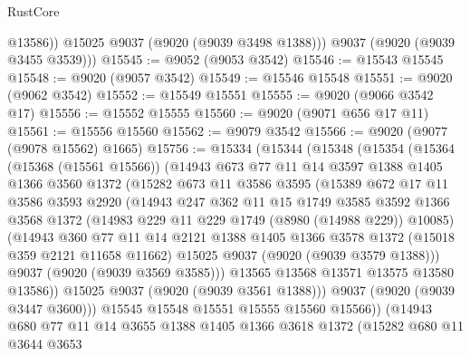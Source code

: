 \begin{lexlean}{RustCore}
\begin{coremodule}
            @13586))
        @15025
        @9037
        (@9020 (@9039 @3498 @1388)))
      @9037
      (@9020 (@9039 @3455 @3539)))
@15545 := @9052 (@9053 @3542)
@15546 := @15543 @15545
@15548 := @9020 (@9057 @3542)
@15549 := @15546 @15548
@15551 := @9020 (@9062 @3542)
@15552 := @15549 @15551
@15555 := @9020 (@9066 @3542 @17)
@15556 := @15552 @15555
@15560 := @9020 (@9071 @656 @17 @11)
@15561 := @15556 @15560
@15562 := @9079 @3542
@15566 := @9020 (@9077 (@9078 @15562) @1665)
@15756 := @15334
    (@15344
      (@15348
        (@15354
          (@15364
            (@15368 (@15561 @15566))
            (@14943
              @673
              @77
              @11
              @14
              @3597
              @1388
              @1405
              @1366
              @3560
              @1372
              (@15282
                @673
                @11
                @3586
                @3595
                (@15389
                  @672
                  @17
                  @11
                  @3586
                  @3593
                  @2920
                  (@14943
                    @247
                    @362
                    @11
                    @15
                    @1749
                    @3585
                    @3592
                    @1366
                    @3568
                    @1372
                    (@14983 @229 @11 @229 @1749 (@8980 (@14988 @229)) @10085)
                    (@14943
                      @360
                      @77
                      @11
                      @14
                      @2121
                      @1388
                      @1405
                      @1366
                      @3578
                      @1372
                      (@15018 @359 @2121 @11658 @11662)
                      @15025
                      @9037
                      (@9020 (@9039 @3579 @1388)))
                    @9037
                    (@9020 (@9039 @3569 @3585)))
                  @13565
                  @13568
                  @13571
                  @13575
                  @13580
                  @13586))
              @15025
              @9037
              (@9020 (@9039 @3561 @1388)))
            @9037
            (@9020 (@9039 @3447 @3600)))
          @15545
          @15548
          @15551
          @15555
          @15560
          @15566))
      (@14943
        @680
        @77
        @11
        @14
        @3655
        @1388
        @1405
        @1366
        @3618
        @1372
        (@15282
          @680
          @11
          @3644
          @3653

\end{coremodule}
\end{lexlean}
